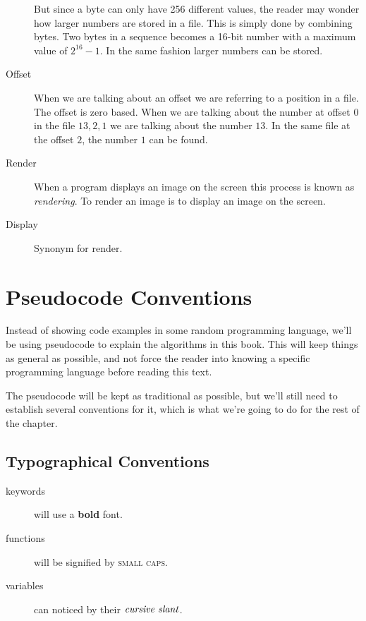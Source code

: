 \begin{description}
  But since a byte can only have 256 different values, the reader may
  wonder how larger numbers are stored in a file. This is simply done
  by combining bytes. Two bytes in a sequence becomes a 16-bit number
  with a maximum value of $2^{16} - 1$. In the same fashion larger
  numbers can be stored.

\item[Offset] When we are talking about an offset we are referring to
  a position in a file. The offset is zero based. When we are talking
  about the number at offset 0 in the file $13,2,1$ we are talking
  about the number $13$. In the same file at the offset $2$, the
  number $1$ can be found.


\item[Render] When a program displays an image on the screen this
  process is known as \textit{rendering}. To render an image is to
  display an image on the screen.

\item[Display] Synonym for render.

\end{description}

\section{Pseudocode Conventions}

Instead of showing code examples in some random programming language,
we'll be using pseudocode to explain the algorithms in this book. This
will keep things as general as possible, and not force the reader into
knowing a specific programming language before reading this text.

The pseudocode will be kept as traditional as possible, but we'll
still need to establish several conventions for it, which is what
we're going to do for the rest of the chapter.

\subsection{Typographical Conventions}

\begin{description}
\item[keywords] will use a \textbf{bold} font.
\item[functions] will be signified by \textsc{small caps}.
\item[variables] can noticed by their $\var{cursive\ slant}$.
\end{description}


